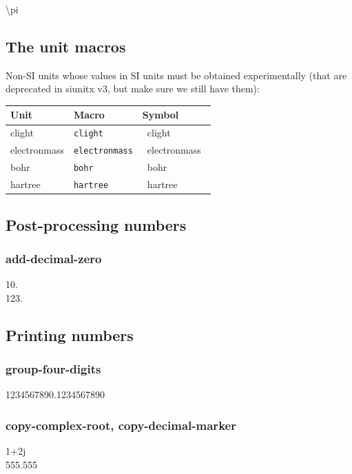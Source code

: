 \documentclass{article}
\def\Backslash{\copy\slashbox}
\begin{document}
%

\num{\pi}\\

\setcounter{section}{4}
\setcounter{subsection}{3}
\subsection{The unit macros}
\newcommand{\showunit}[1]{#1 & \texttt{\Backslash#1} & \si{\csname#1\endcsname}}
Non-SI units whose values in SI units must be obtained experimentally
(that are deprecated in siunitx v3, but make sure we still have them):
\begin{center}
\begin{tabular}{lll}\toprule
Unit & Macro & Symbol \\\midrule
\showunit{clight}\\
\showunit{electronmass}\\
\showunit{bohr}\\
\showunit{hartree}\\\bottomrule
\end{tabular}
\end{center}

\setcounter{section}{5}
\setcounter{subsection}{4}
\subsection{Post-processing numbers}
\subsubsection{add-decimal-zero}
\num{10.}\\
\num[add-decimal-zero = false]{123.}

\subsection{Printing numbers}
\subsubsection{group-four-digits}
\num[group-four-digits]{1234567890.1234567890}

\subsubsection{copy-complex-root, copy-decimal-marker}
\num[copy-complex-root]{1+2j}\\
\num[copy-decimal-marker]{555,555}
\end{document}
